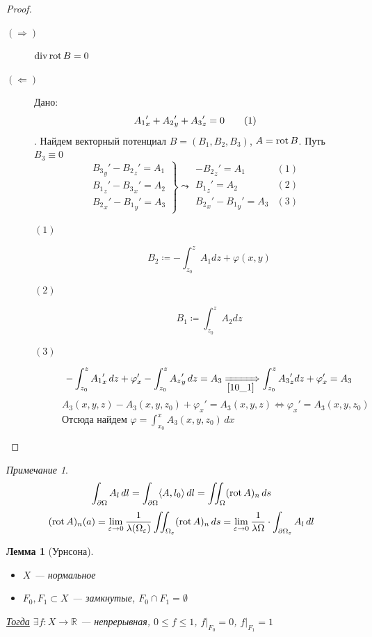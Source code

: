 \documentclass[oneside]{book}
\newcommand\addtag{\refstepcounter{equation}\tag{\theequation}}
\newcommand{\R}{\mathbb{R}}
\theoremstyle{plain}
\newtheorem{lemma}{Лемма}
\theoremstyle{remark}
\newtheorem*{remark}{Примечание}
\theoremstyle{definition}
\begin{document}
\begin{proof}
\-
\begin{description}
\item[{\((\Rightarrow)\)}] \(\mathop{\rm div} \mathop{\rm rot}\nolimits B = 0\)
\item[{\((\Leftarrow)\)}] Дано: \[{A_1}_x' + {A_2}_y' + {A_3}_z' = 0 \addtag\label{10_1}\]. Найдем векторный потенциал \(B = (B_1, B_2, B_3)\), \(A = \mathop{\rm rot}\nolimits B\). Путь \(B_3 \equiv 0\)
\[ \left.\begin{array}{l}
  {B_3}_y' - {B_2}_z' = A_1 \\
  {B_1}_z' - {B_3}_x' = A_2 \\
  {B_2}_x' - {B_1}_y' = A_3
  \end{array}\right\} \leadsto \begin{array}{rl}
  -{B_2}_z' = A_1 & (1)\\
  {B_1}_z'  = A_2 & (2) \\
  {B_2}_x' - {B_1}_y' = A_3 & (3)
  \end{array}\]
\begin{description}
\item[{\((1)\)}] \[ B_2 \coloneqq - \int_{z_0}^z A_1 dz + \varphi(x, y) \]
\item[{\((2)\)}] \[ B_1 \coloneqq \int_{z_0}^z A_2 dz \]
\item[{\((3)\)}] \[ -\int_{z_0}^z {A_1}'_x\,dz + \varphi'_x - \int_{z_0}^z {A_z}'_y\,dz = A_3 \xRightarrow[\ref{10_1}]{} \int_{z_0}^z {A_3}_z' dz + \varphi_x' = A_3 \]
\[ A_3(x, y, z) - A_3(x, y, z_0) + \varphi_x' = A_3(x, y, z) \Leftrightarrow \varphi_x' = A_3(x, y, z_0) \]
Отсюда найдем \(\varphi = \int_{x_0}^x A_3(x,y,z_0)\,dx\)
\end{description}
\end{description}
\end{proof}
\begin{remark}
\[ \int_{\partial \Omega} A_l\,dl = \int_{\partial \Omega} \langle A, l_0 \rangle \,dl = \iint_{\Omega} (\mathop{\rm rot}\nolimits A)_n \,ds \]
\[ (\mathop{\rm rot}\nolimits A)_n(a) = \lim_{\varepsilon \to 0} \frac{1}{\lambda(\Omega_\varepsilon)} \iint_{\Omega_\varepsilon} (\mathop{\rm rot}\nolimits A)_n\,ds = \lim_{\varepsilon \to 0}\frac{1}{\lambda \Omega} \cdot \int_{\partial \Omega_\varepsilon} A_l\,dl \]
\end{remark}
\begin{lemma}[Урнсона]
\-
\begin{itemize}
\item \(X\) --- нормальное
\item \(F_0, F_1 \subset X\) --- замкнутые, \(F_0 \cap F_1 = \emptyset\)
\end{itemize}
\uline{Тогда} \(\exists f: X \to \R\) --- непрерывная, \(0 \le f \le 1\), \(f\big|_{F_0} = 0\), \(f\big|_{F_1} = 1\)
\end{lemma}
\end{document}

